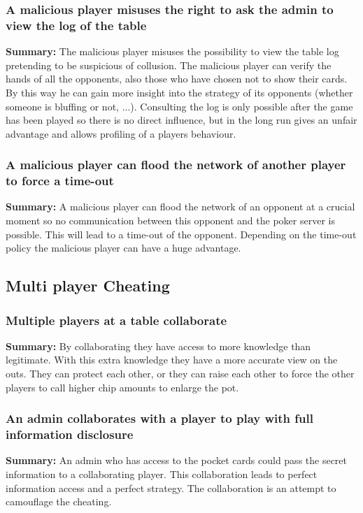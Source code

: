 \documentclass[a4paper,11pt]{report}
\begin{document}
\subsubsection{A malicious player misuses the right to ask the admin to view the log of the table}
\textbf{Summary:} The malicious player misuses the possibility to view the table log pretending to be suspicious of collusion. The malicious player can verify the hands of all the opponents, also those who have chosen not to show their cards. By this way he can gain more insight into the strategy of its opponents (whether someone is bluffing or not, ...). Consulting the log is only possible after the game has been played so there is no direct influence, but in the long run gives an unfair advantage and allows profiling of a players behaviour.

\subsubsection{A malicious player can flood the network of another player to force a time-out}
\textbf{Summary:} A malicious player can flood the network of an opponent at a crucial moment so no communication between this opponent and the poker server is possible. This will lead to a time-out of the opponent. Depending on the time-out policy the malicious player can have a huge advantage.

\subsection{Multi player Cheating}
\subsubsection{Multiple players at a table collaborate}
\textbf{Summary:} By collaborating they have access to more knowledge than legitimate. With this extra knowledge they have a more accurate view on the outs. They can protect each other, or they can raise each other to force the other players to call higher chip amounts to enlarge the pot.
\subsubsection{An admin collaborates with a player to play with full information disclosure}
\textbf{Summary:} An admin who has access to the pocket cards could pass the secret information to a collaborating player. This collaboration leads to perfect information access and a perfect strategy. The collaboration is an attempt to camouflage the cheating.
\end{document}

